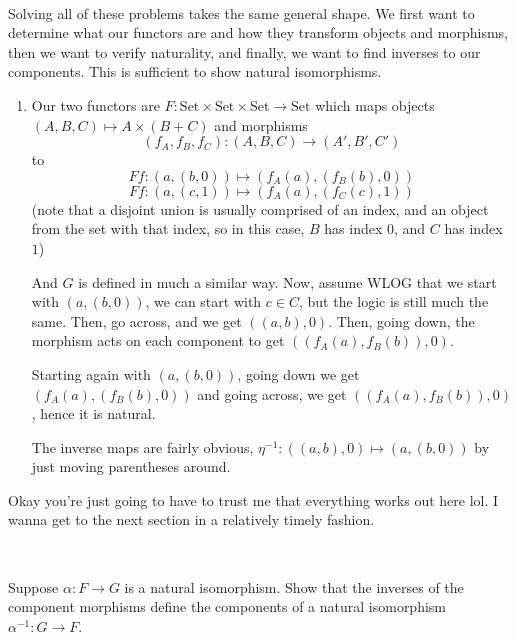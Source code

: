 \documentclass{article}
\begin{document}
\begin{solution}
\

Solving all of these problems takes the same general shape. We first want to determine what our functors are and how they transform objects and morphisms, then we want to verify naturality, and finally, we want to find inverses to our components. This is sufficient to show natural isomorphisms.

\begin{enumerate}
    \item Our two functors are $F: \text{Set} \times \text{Set} \times \text{Set} \to \text{Set}$ which maps objects $(A,B,C) \mapsto A \times (B+C)$ and morphisms $$(f_A, f_B, f_C): (A,B,C) \to (A', B', C')$$ to $$Ff: (a, (b, 0)) \mapsto (f_A(a), (f_B(b), 0))$$ $$Ff: (a, (c,1)) \mapsto (f_A(a), (f_C(c), 1))$$(note that a disjoint union is usually comprised of an index, and an object from the set with that index, so in this case, $B$ has index $0$, and $C$ has index $1$)
    
    And $G$ is defined in much a similar way. Now, assume WLOG that we start with $(a, (b, 0))$, we can start with $c \in C$, but the logic is still much the same. Then, go across, and we get $((a,b), 0)$. Then, going down, the morphism acts on each component to get $((f_A(a), f_B(b)), 0)$.

    Starting again with $(a, (b,0))$, going down we get $(f_A(a), (f_B(b), 0))$ and going across, we get $((f_A(a), f_B(b)), 0)$, hence it is natural. 

    The inverse maps are fairly obvious, $\eta ^{-1}: ((a,b),0) \mapsto (a, (b,0))$ by just moving parentheses around.
\end{enumerate}

Okay you're just going to have to trust me that everything works out here lol. I wanna get to the next section in a relatively timely fashion.
\end{solution}

\begin{exercise}[Riehl 1.4.1]
\

Suppose $\alpha: F \to G$ is a natural isomorphism. Show that the inverses of
the component morphisms define the components of a natural isomorphism $\alpha ^{-1} : G \to F$.
\end{exercise}
\end{document}
